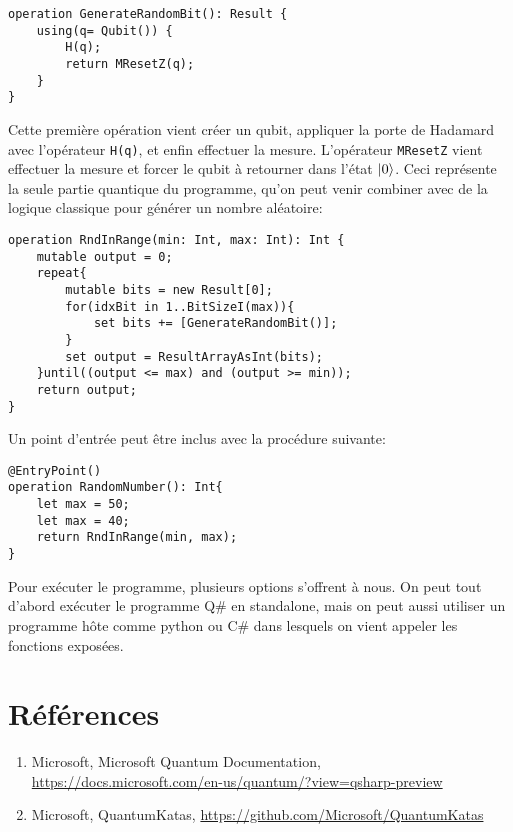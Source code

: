 \documentclass[12pt,a4paper]{article}
\DeclarePairedDelimiter\ket{\lvert}{\rangle}
\begin{document}
\begin{lstlisting}
operation GenerateRandomBit(): Result {
    using(q= Qubit()) {
        H(q);
        return MResetZ(q);
    }
}
\end{lstlisting}

Cette première opération vient créer un qubit, appliquer la porte de Hadamard avec l'opérateur \texttt{H(q)}, et enfin effectuer la mesure. L'opérateur \texttt{MResetZ} vient effectuer la mesure et forcer le qubit à retourner dans l'état $\ket{0}$. Ceci représente la seule partie quantique du programme, qu'on peut venir combiner avec de la logique classique pour générer un nombre aléatoire:

\begin{lstlisting}
operation RndInRange(min: Int, max: Int): Int {
    mutable output = 0;
    repeat{
        mutable bits = new Result[0];
        for(idxBit in 1..BitSizeI(max)){
            set bits += [GenerateRandomBit()];
        }
        set output = ResultArrayAsInt(bits);
    }until((output <= max) and (output >= min));
    return output;
}
\end{lstlisting}

Un point d'entrée peut être inclus avec la procédure suivante: 

\begin{lstlisting}
@EntryPoint()
operation RandomNumber(): Int{
    let max = 50;
    let max = 40;
    return RndInRange(min, max);
}
\end{lstlisting}

Pour exécuter le programme, plusieurs options s'offrent à nous. On peut tout d'abord exécuter le programme Q\# en standalone, mais on peut aussi utiliser un programme hôte comme python ou C\# dans lesquels on vient appeler les fonctions exposées.

\section{Références}

\begin{enumerate}
    \item Microsoft, Microsoft Quantum Documentation, \url{https://docs.microsoft.com/en-us/quantum/?view=qsharp-preview}
    \item Microsoft, QuantumKatas, \url{https://github.com/Microsoft/QuantumKatas}
\end{enumerate}

\end{document}

